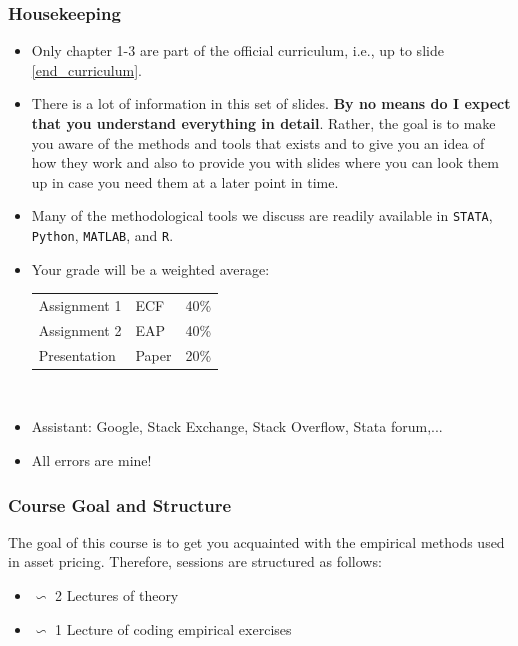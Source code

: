\documentclass[xcolor=dvipsnames, english, 8pt]{beamer}
\begin{document}
\begin{frame}
\frametitle{Housekeeping}
    \begin{itemize}
    \item {\color{ubRed}Only chapter 1-3 are part of the official curriculum}, i.e., up to slide \ref{end_curriculum}.
        \item There is a lot of information in this set of slides. \textbf{By no means do I expect that you understand everything in detail}. Rather, the goal is to make you aware of the methods and tools that exists and to give you an idea of how they work and also to provide you with slides where you can look them up in case you need them at a later point in time.\vspace{0.25cm}\\
        \item Many of the methodological tools we discuss are readily available in  \texttt{STATA}, \texttt{Python}, \texttt{MATLAB}, and \texttt{R}.
    	\item Your grade will be a weighted average:\vspace{0.5cm}\\

            \begin{table}
              \centering
            \begin{tabular}{l l l}
              \hline
              Assignment 1 & ECF & 40\% \\
              {\color{red}Assignment 2} & {\color{red}EAP} & {\color{red}40\%} \\
              Presentation & Paper & 20\% \\
              \hline
            \end{tabular}\vspace{0.25cm}\\
            \end{table}

\item Assistant: Google, Stack Exchange, Stack Overflow, Stata forum,...
\item All errors are mine!
	\end{itemize}
\end{frame}


\begin{frame}
\frametitle{Course Goal and Structure}
The goal of this course is to get you acquainted with the empirical methods used in asset pricing. Therefore, sessions are structured as follows:\vspace{0.25cm}\\
\begin{itemize}
    \item $\backsim$ 2 Lectures of theory
    \item $\backsim$ 1 Lecture of coding empirical exercises
    \end{itemize}
\end{frame}
\end{document}
